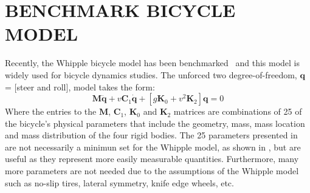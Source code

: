 \documentclass{bmd2010p}
\begin{document}
\section{BENCHMARK BICYCLE MODEL}
Recently, the Whipple bicycle model has been benchmarked~\cite{Meijaard2007}
and this model is widely used for bicycle dynamics studies. The unforced two
degree-of-freedom, $\mathbf{q}$ = [steer and roll], model takes the form:
\begin{equation}
    \mathbf{M\ddot{q}}
    +v\mathbf{C}_1\mathbf{\dot{q}}
    +\left[g\mathbf{K}_0
    +v^2\mathbf{K}_2\right]\mathbf{q}
    =0
    \label{eq:canonical}
\end{equation}
Where the entries to the $\mathbf{M}$, $\mathbf{C}_1$, $\mathbf{K}_0$ and $\mathbf{K}_2$
matrices are combinations of 25 of the bicycle's physical parameters that
include the geometry, mass, mass location and mass distribution of the four
rigid bodies. The 25 parameters presented in \cite{Meijaard2007} are not
necessarily a minimun set for the Whipple model, as shown in \cite{Sharp2008},
but are useful as they represent more easily measurable quantities.
Furthermore, many more parameters are not needed due to the assumptions of the
Whipple model such as no-slip tires, lateral symmetry, knife edge wheels, etc.
\end{document}
